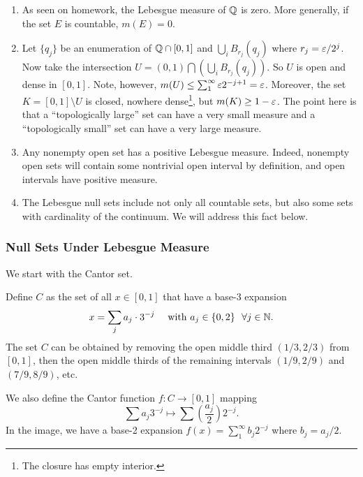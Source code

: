 \documentclass[12pt]{article} %
\begin{document}
\begin{remark}
    \begin{enumerate}
        \item As seen on homework, the Lebesgue measure of $\mathbb{Q}$ is zero. More generally, if the set $E$ is countable, $m(E) = 0$.
        \item Let $\{q_j\}$ be an enumeration of $\mathbb{Q} \cap [0,1]$ and $\bigcup_i B_{r_j}(q_j)$ where $r_j = \varepsilon / 2^j$. Now take the intersection $U = (0,1) \bigcap \left( \bigcup_i B_{r_j}(q_j) \right)$. So $U$ is open and dense in $[0,1]$. Note, however, $m(U) \leq \sum_1^\infty \varepsilon 2^{-j+1} = \varepsilon$. Moreover, the set $K = [0,1] \setminus U$ is closed, nowhere dense\footnote{The closure has empty interior.}, but $m(K) \geq 1 - \varepsilon$. The point here is that a ``topologically large'' set can have a very small measure and a ``topologically small'' set can have a very large measure.
        \item Any nonempty open set has a positive Lebesgue measure. Indeed, nonempty open sets will contain some nontrivial open interval by definition, and open intervals have positive measure.
        \item The Lebesgue null sets include not only all countable sets, but also some sets with cardinality of the continuum. We will address this fact below.
    \end{enumerate}
\end{remark}

\subsubsection{Null Sets Under Lebesgue Measure}

We start with the Cantor set.

\begin{definition}
    Define $C$ as the set of all $x \in [0,1]$ that have a base-3 expansion \[x = \sum_j a_j \cdot 3^{-j} \ \ \ \ \text{with} \ a_j \in \{0,2\} \ \ \forall j \in \mathbb{N}.\]
    The set $C$ can be obtained by removing the open middle third $(1/3, 2/3)$ from $[0,1]$, then the open middle thirds of the remaining intervals $(1/9, 2/9)$ and $(7/9, 8/9)$, etc. 
    
    We also define the Cantor function $f : C \to [0,1]$ mapping \[\sum a_j 3^{-j} \mapsto \sum \left(\frac{a_j}{2}\right) 2^{-j}.\] In the image, we have a base-2 expansion $f(x) = \sum_1^\infty b_j 2^{-j}$ where $b_j = a_j / 2$.
\end{definition}
\end{document}
